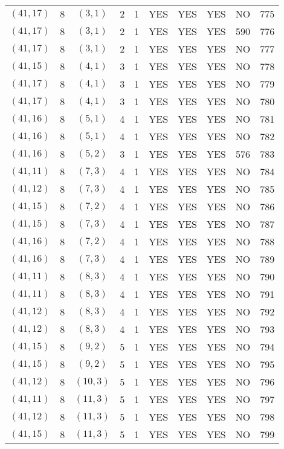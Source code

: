 \begin{longtable}{|c|c|c|c|c|c|c|c|c|c|}
$(41, 17)$ & 8 & $(3, 1)$ & 2 & 1 & YES & YES & YES & NO & 775\\
$(41, 17)$ & 8 & $(3, 1)$ & 2 & 1 & YES & YES & YES & 590 & 776\\
$(41, 17)$ & 8 & $(3, 1)$ & 2 & 1 & YES & YES & YES & NO & 777\\
$(41, 15)$ & 8 & $(4, 1)$ & 3 & 1 & YES & YES & YES & NO & 778\\
$(41, 17)$ & 8 & $(4, 1)$ & 3 & 1 & YES & YES & YES & NO & 779\\
$(41, 17)$ & 8 & $(4, 1)$ & 3 & 1 & YES & YES & YES & NO & 780\\
$(41, 16)$ & 8 & $(5, 1)$ & 4 & 1 & YES & YES & YES & NO & 781\\
$(41, 16)$ & 8 & $(5, 1)$ & 4 & 1 & YES & YES & YES & NO & 782\\
$(41, 16)$ & 8 & $(5, 2)$ & 3 & 1 & YES & YES & YES & 576 & 783\\
$(41, 11)$ & 8 & $(7, 3)$ & 4 & 1 & YES & YES & YES & NO & 784\\
$(41, 12)$ & 8 & $(7, 3)$ & 4 & 1 & YES & YES & YES & NO & 785\\
$(41, 15)$ & 8 & $(7, 2)$ & 4 & 1 & YES & YES & YES & NO & 786\\
$(41, 15)$ & 8 & $(7, 3)$ & 4 & 1 & YES & YES & YES & NO & 787\\
$(41, 16)$ & 8 & $(7, 2)$ & 4 & 1 & YES & YES & YES & NO & 788\\
$(41, 16)$ & 8 & $(7, 3)$ & 4 & 1 & YES & YES & YES & NO & 789\\
$(41, 11)$ & 8 & $(8, 3)$ & 4 & 1 & YES & YES & YES & NO & 790\\
$(41, 11)$ & 8 & $(8, 3)$ & 4 & 1 & YES & YES & YES & NO & 791\\
$(41, 12)$ & 8 & $(8, 3)$ & 4 & 1 & YES & YES & YES & NO & 792\\
$(41, 12)$ & 8 & $(8, 3)$ & 4 & 1 & YES & YES & YES & NO & 793\\
$(41, 15)$ & 8 & $(9, 2)$ & 5 & 1 & YES & YES & YES & NO & 794\\
$(41, 15)$ & 8 & $(9, 2)$ & 5 & 1 & YES & YES & YES & NO & 795\\
$(41, 12)$ & 8 & $(10, 3)$ & 5 & 1 & YES & YES & YES & NO & 796\\
$(41, 11)$ & 8 & $(11, 3)$ & 5 & 1 & YES & YES & YES & NO & 797\\
$(41, 12)$ & 8 & $(11, 3)$ & 5 & 1 & YES & YES & YES & NO & 798\\
$(41, 15)$ & 8 & $(11, 3)$ & 5 & 1 & YES & YES & YES & NO & 799\\

\end{longtable}
